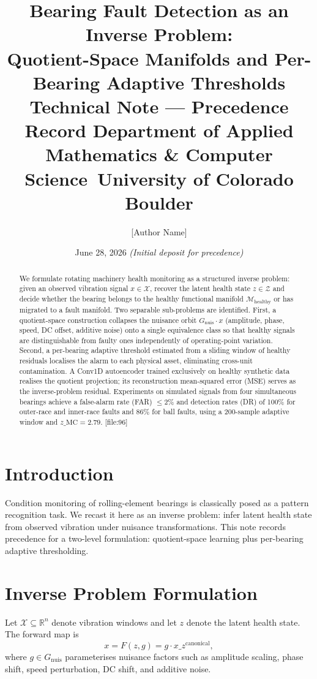 \documentclass[11pt, letterpaper]{article}
\newcommand{\Mhealthy}{\mathcal{M}_{\mathrm{healthy}}}
\newcommand{\Gnuis}{G_{\mathrm{nuis}}}
\newcommand{\Lspace}{\mathcal{Z}}
\newcommand{\Xspace}{\mathcal{X}}
\newcommand{\R}{\mathbb{R}}
\begin{document}
\title{\textbf{Bearing Fault Detection as an Inverse Problem:}\\
\textbf{Quotient-Space Manifolds and Per-Bearing Adaptive Thresholds}
\large Technical Note --- Precedence Record
\normalsize Department of Applied Mathematics \& Computer Science\ University of Colorado Boulder}  \author[1]{[Author Name]}  \date{June 28, 2026 \quad\textit{(Initial deposit for precedence)}} \maketitle  \begin{abstract} We formulate rotating machinery health monitoring as a structured inverse problem: given an observed vibration signal \(x \in \Xspace\), recover the latent health state \(z \in \Lspace\) and decide whether the bearing belongs to the healthy functional manifold \(\Mhealthy\) or has migrated to a fault manifold. Two separable sub-problems are identified. First, a quotient-space construction collapses the nuisance orbit \(\Gnuis \cdot x\) (amplitude, phase, speed, DC offset, additive noise) onto a single equivalence class so that healthy signals are distinguishable from faulty ones independently of operating-point variation. Second, a per-bearing adaptive threshold estimated from a sliding window of healthy residuals localises the alarm to each physical asset, eliminating cross-unit contamination. A Conv1D autoencoder trained exclusively on healthy synthetic data realises the quotient projection; its reconstruction mean-squared error (MSE) serves as the inverse-problem residual. Experiments on simulated signals from four simultaneous bearings achieve a false-alarm rate (FAR) \(\leq 2\%\) and detection rates (DR) of 100\% for outer-race and inner-race faults and 86\% for ball faults, using a 200-sample adaptive window and \(z\_{\mathrm{MC}} = 2.79\). [file:96] \end{abstract}  \section{Introduction}  Condition monitoring of rolling-element bearings is classically posed as a pattern recognition task. We recast it here as an inverse problem: infer latent health state from observed vibration under nuisance transformations. This note records precedence for a two-level formulation: quotient-space learning plus per-bearing adaptive thresholding.  \section{Inverse Problem Formulation}  Let \(\Xspace \subseteq \R^n\) denote vibration windows and let \(z\) denote the latent health state. The forward map is \[  x = F(z,g) = g \cdot x\_z^{\mathrm{canonical}},\]
where \(g \in \Gnuis\) parameterises nuisance factors such as amplitude scaling, phase shift, speed perturbation, DC shift, and additive noise.
\end{document}
